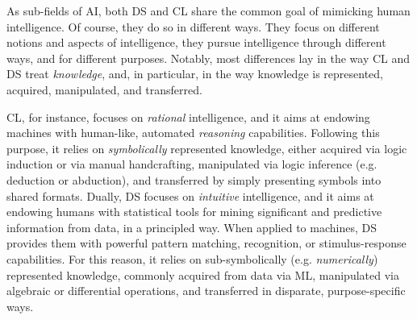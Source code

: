 \documentclass[12pt,a4paper,openright,twoside]{book}
\begin{document}
As sub-fields of AI, both DS and CL share the common goal of mimicking human intelligence.
%
Of course, they do so in different ways.
%
They focus on different notions and aspects of intelligence, they pursue intelligence through different ways, and for different purposes.
%
Notably, most differences lay in the way CL and DS treat \emph{knowledge}, and, in particular, in the way knowledge is represented, acquired, manipulated, and transferred.

CL, for instance, focuses on \emph{rational} intelligence, and it aims at endowing machines with human-like, automated \emph{reasoning} capabilities.
%
Following this purpose, it relies on \emph{symbolically} represented knowledge, either acquired via logic induction or via manual handcrafting, manipulated via logic inference (e.g. deduction or abduction), and transferred by simply presenting symbols into shared formats.
%
Dually, DS focuses on \emph{intuitive} intelligence, and it aims at endowing humans with statistical tools for mining significant and predictive information from data, in a principled way.
%
When applied to machines, DS provides them with powerful pattern matching, recognition, or stimulus-response capabilities. 
%
For this reason, it relies on sub-symbolically (e.g. \emph{numerically}) represented knowledge, commonly acquired from data via ML, manipulated via algebraic or differential operations, and transferred in disparate, purpose-specific ways.
\end{document}
